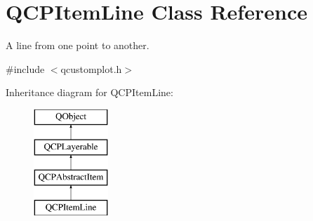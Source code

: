 \hypertarget{class_q_c_p_item_line}{}\section{Q\+C\+P\+Item\+Line Class Reference}
\label{class_q_c_p_item_line}


A line from one point to another.  




{\ttfamily \#include $<$qcustomplot.\+h$>$}

Inheritance diagram for Q\+C\+P\+Item\+Line\+:\begin{figure}[H]
\begin{center}
\leavevmode
\includegraphics[height=4.000000cm]{dd/d8c/class_q_c_p_item_line}
\end{center}
\end{figure}

